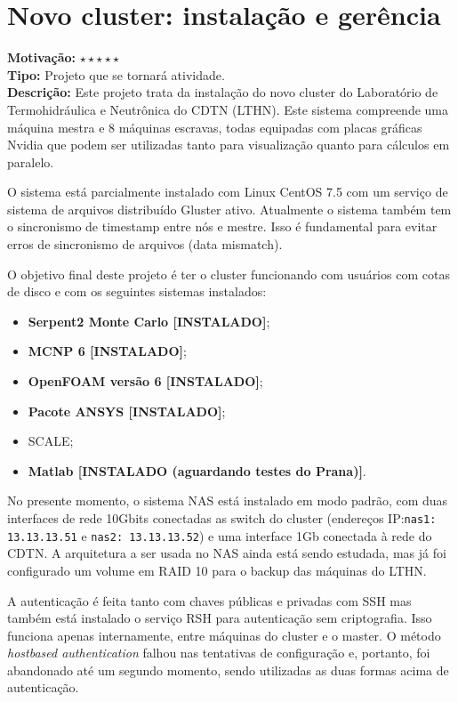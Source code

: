 \chapter{Novo cluster: instalação e gerência}

\textbf{Motivação:} $\star\star\star\star\star$\\

\textbf{Tipo:} Projeto que se tornará atividade.\\

\textbf{Descrição:} Este projeto trata da instalação do novo cluster do Laboratório 
de Termohidráulica e Neutrônica do CDTN (LTHN). Este sistema compreende uma máquina mestra e 8 máquinas escravas, todas equipadas com placas gráficas Nvidia que podem ser utilizadas tanto para visualização quanto para cálculos em paralelo.

O sistema está parcialmente instalado com Linux CentOS 7.5 com um serviço de 
sistema de arquivos distribuído Gluster ativo. Atualmente o sistema também tem 
o sincronismo de timestamp entre nós e mestre. Isso é fundamental para evitar 
erros de sincronismo de arquivos (data mismatch).

O objetivo final deste projeto é ter o cluster funcionando com usuários com cotas 
de disco e com os seguintes sistemas instalados:

\begin{itemize}
	\item \textbf{Serpent2 Monte Carlo [INSTALADO]};
	\item \textbf{MCNP 6 [INSTALADO]};
	\item \textbf{OpenFOAM versão 6 [INSTALADO]};
	\item \textbf{Pacote ANSYS [INSTALADO]};
	\item SCALE;
	\item \textbf{Matlab [INSTALADO (aguardando testes do Prana)]}.
\end{itemize}

No presente momento, o sistema NAS está instalado em modo padrão, com duas 
interfaces de rede 10Gbits conectadas as switch do cluster (endereços IP:\texttt{nas1: 13.13.13.51} e \texttt{nas2: 13.13.13.52}) e uma interface 
1Gb conectada à rede do CDTN. A arquitetura a ser usada no NAS ainda está sendo 
estudada, mas já foi configurado um volume em RAID 10 para o backup das máquinas 
do LTHN.

A autenticação é feita tanto com chaves públicas e privadas com SSH mas também 
está instalado o serviço RSH para autenticação sem criptografia. Isso funciona 
apenas internamente, entre máquinas do cluster e o master. O método 
\textit{hostbased authentication} falhou nas tentativas de configuração e, portanto, foi abandonado até um segundo momento, sendo utilizadas as duas 
formas acima de autenticação.\\

